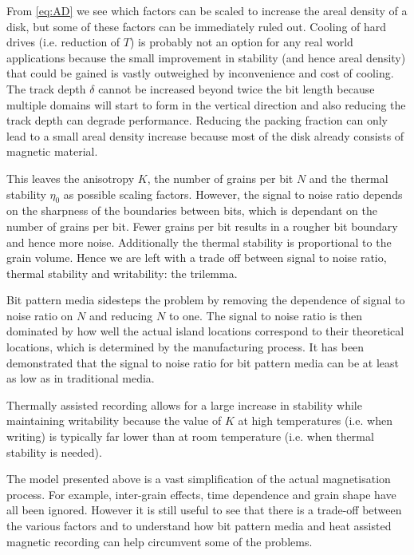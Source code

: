 From \eqref{eq:AD} we see which factors can be scaled to increase the areal
density of a disk, but some of these factors can be immediately ruled
out. Cooling of hard drives (i.e. reduction of $T$) is probably not an option
for any real world applications because the small improvement in stability (and
hence areal density) that could be gained is vastly outweighed by inconvenience
and cost of cooling. The track depth $\delta$ cannot be increased beyond twice
the bit length because multiple domains will start to form in the vertical
direction \cite{McDaniel2005} and also reducing the track depth can degrade
performance\cite{Litvinov2002}. Reducing the packing fraction can only lead to a
small areal density increase because most of the disk already consists of
magnetic material.

This leaves the anisotropy $K$, the number of grains per bit $N$ and the thermal
stability $\eta_{0}$ as possible scaling factors.  However, the signal to noise
ratio depends on the sharpness of the boundaries between bits, which is
dependant on the number of grains per bit. Fewer grains per bit results in a
rougher bit boundary and hence more noise. Additionally the thermal stability is
proportional to the grain volume. Hence we are left with a trade off between
signal to noise ratio, thermal stability and writability: the trilemma.

Bit pattern media sidesteps the problem by removing the dependence
of signal to noise ratio on $N$ and reducing $N$ to one. The signal
to noise ratio is then dominated by how well the actual island locations
correspond to their theoretical locations, which is determined by
the manufacturing process. It has been demonstrated that the signal
to noise ratio for bit pattern media can be at least as low as in
traditional media.\cite{Moritz2004}

Thermally assisted recording allows for a large increase in stability while maintaining writability because the value of $K$ at high temperatures (i.e. when writing) is typically far lower than at room temperature (i.e. when thermal stability is needed).

The model presented above is a vast simplification of the actual magnetisation process. For example, inter-grain effects, time dependence and grain shape have all been ignored. However it is still useful to see that there is a trade-off between the various factors and to understand how bit pattern media and heat assisted magnetic recording can help circumvent some of the problems.


